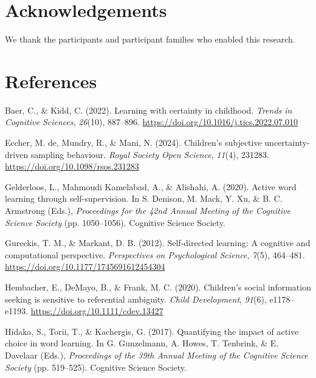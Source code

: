 \documentclass[10pt, letterpaper]{article}
\begin{document}
\section{Acknowledgements}\label{acknowledgements}

We thank the participants and participant families who enabled this
research.

\section{References}\label{references}

\setlength{\parindent}{-0.1in} 
\setlength{\leftskip}{0.125in}

\noindent

\label{refs}
\begin{CSLReferences}{1}{0}
Baer, C., \& Kidd, C. (2022). Learning with certainty in childhood.
\emph{Trends in Cognitive Sciences}, \emph{26}(10), 887--896.
\url{https://doi.org/10.1016/j.tics.2022.07.010}

Eccher, M. de, Mundry, R., \& Mani, N. (2024). Children's subjective
uncertainty-driven sampling behaviour. \emph{Royal Society Open
Science}, \emph{11}(4), 231283.
\url{https://doi.org/10.1098/rsos.231283}

Gelderloos, L., Mahmoudi Kamelabad, A., \& Alishahi, A. (2020). Active
word learning through self-supervision. In S. Denison, M. Mack, Y. Xu,
\& B. C. Armstrong (Eds.), \emph{Proceedings for the 42nd {Annual}
{Meeting} of the {Cognitive} {Science} {Society}} (pp. 1050--1056).
Cognitive Science Society.

Gureckis, T. M., \& Markant, D. B. (2012). Self-directed learning: A
cognitive and computational perspective. \emph{Perspectives on
Psychological Science}, \emph{7}(5), 464--481.
\url{https://doi.org/10.1177/1745691612454304}

Hembacher, E., DeMayo, B., \& Frank, M. C. (2020). Children's social
information seeking is sensitive to referential ambiguity. \emph{Child
Development}, \emph{91}(6), e1178--e1193.
\url{https://doi.org/10.1111/cdev.13427}

Hidaka, S., Torii, T., \& Kachergis, G. (2017). Quantifying the impact
of active choice in word learning. In G. Gunzelmann, A. Howes, T.
Tenbrink, \& E. Davelaar (Eds.), \emph{Proceedings of the 39th {Annual}
{Meeting} of the {Cognitive} {Science} {Society}} (pp. 519--525).
Cognitive Science Society.


\end{CSLReferences}
\end{document}

